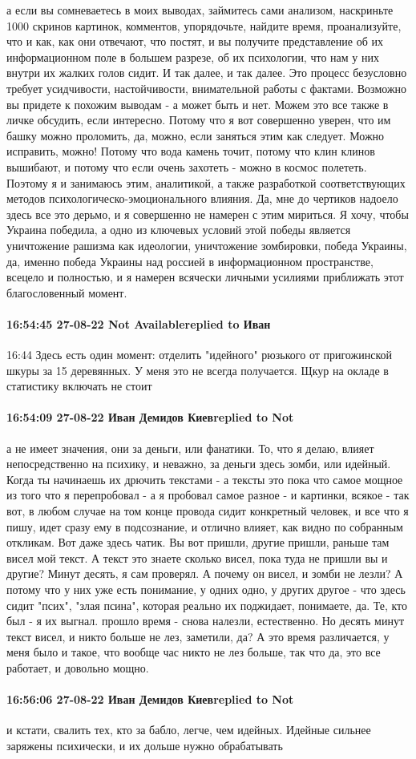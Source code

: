 а если вы сомневаетесь в моих выводах, займитесь сами анализом, наскриньте 1000
скринов картинок, комментов, упорядочьте, найдите время, проанализуйте, что и
как, как они отвечают, что постят, и вы получите представление об их
информационном поле в большем разрезе, об их психологии, что нам у них внутри
их жалких голов сидит. И так далее, и так далее. Это процесс безусловно требует
усидчивости, настойчивости, внимательной работы с фактами. Возможно вы придете
к похожим выводам - а может быть и нет. Можем это все также в личке обсудить,
если интересно. Потому что я вот совершенно уверен, что им башку можно
проломить, да, можно, если заняться этим как следует. Можно исправить, можно!
Потому что вода камень точит, потому что клин клинов вышибают, и потому что
если очень захотеть - можно в космос полететь. Поэтому я и занимаюсь этим,
аналитикой, а также разработкой соответствующих методов
психологическо-эмоционального влияния. Да, мне до чертиков надоело здесь все
это дерьмо, и я совершенно не намерен с этим мириться. Я хочу, чтобы Украина
победила, а одно из ключевых условий этой победы является уничтожение рашизма
как идеологии, уничтожение зомбировки, победа Украины, да, именно победа
Украины над россией в информационном пространстве, всецело и полностью, и я
намерен всячески личными усилиями приближать этот благословенный момент.

\paragraph{16:54:45 27-08-22 Not Availablereplied to Иван}
16:44
Здесь есть один момент: отделить "идейного" рюзького от пригожинской шкуры за 15 деревянных. У меня это не всегда получается. Щкур на окладе в статистику включать не стоит


\paragraph{16:54:09 27-08-22 Иван Демидов Киевreplied to Not}

а не имеет значения, они за деньги, или фанатики. То, что я делаю, влияет
непосредственно на психику, и неважно, за деньги здесь зомби, или идейный.
Когда ты начинаешь их дрючить текстами - а тексты это пока что самое мощное из
того что я перепробовал - а я пробовал самое разное - и картинки, всякое - так
вот, в любом случае на том конце провода сидит конкретный человек, и все что я
пишу, идет сразу ему в подсознание, и отлично влияет, как видно по собранным
откликам. Вот даже здесь чатик. Вы вот пришли, другие пришли, раньше там висел
мой текст. А текст это знаете сколько висел, пока туда не пришли вы и другие?
Минут десять, я сам проверял. А почему он висел, и зомби не лезли? А потому что
у них уже есть понимание, у одних одно, у других другое - что здесь сидит
"псих", "злая псина", которая реально их поджидает, понимаете, да. Те, кто был
- я их выгнал. прошло время - снова налезли, естественно. Но десять минут текст
висел, и никто больше не лез, заметили, да? А это время различается, у меня
было и такое, что вообще час никто не лез больше, так что да, это все работает,
и довольно мощно.

\paragraph{16:56:06 27-08-22 Иван Демидов Киевreplied to Not}

и кстати, свалить тех, кто за бабло, легче, чем идейных. Идейные сильнее
заряжены психически, и их дольше нужно обрабатывать
